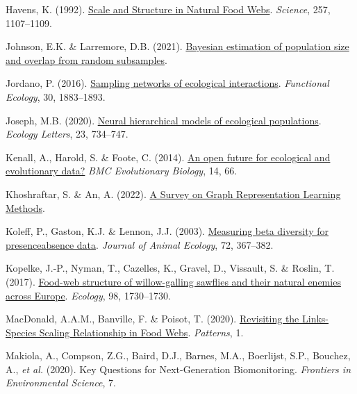 \documentclass[10pt,oneside]{article}
\newlength{\cslhangindent}
\newenvironment{CSLReferences}[3] %
 {%
  \setlength{\parindent}{0pt}
  \ifodd #1 \everypar{\setlength{\hangindent}{\cslhangindent}}\ignorespaces\fi
  \ifnum #2 > 0
  \setlength{\parskip}{#2\baselineskip}
  \fi
 }%
 {}
\begin{document}
\begin{CSLReferences}{1}{0}
\leavevmode{}%
Havens, K. (1992).
\href{https://doi.org/10.1126/science.257.5073.1107}{Scale and Structure
in Natural Food Webs}. \emph{Science}, 257, 1107--1109.

\leavevmode{}%
Johnson, E.K. \& Larremore, D.B. (2021).
\href{https://doi.org/10.1101/2021.07.06.451319}{Bayesian estimation of
population size and overlap from random subsamples}.

\leavevmode{}%
Jordano, P. (2016).
\href{https://doi.org/10.1111/1365-2435.12763}{Sampling networks of
ecological interactions}. \emph{Functional Ecology}, 30, 1883--1893.

\leavevmode{}%
Joseph, M.B. (2020). \href{https://doi.org/10.1111/ele.13462}{Neural
hierarchical models of ecological populations}. \emph{Ecology Letters},
23, 734--747.

\leavevmode{}%
Kenall, A., Harold, S. \& Foote, C. (2014).
\href{https://doi.org/10.1186/1471-2148-14-66}{An open future for
ecological and evolutionary data?} \emph{BMC Evolutionary Biology}, 14,
66.

\leavevmode{}%
Khoshraftar, S. \& An, A. (2022).
\href{https://doi.org/10.48550/arXiv.2204.01855}{A Survey on Graph
Representation Learning Methods}.

\leavevmode{}%
Koleff, P., Gaston, K.J. \& Lennon, J.J. (2003).
\href{https://doi.org/10.1046/j.1365-2656.2003.00710.x}{Measuring beta
diversity for presenceabsence data}. \emph{Journal of Animal Ecology},
72, 367--382.

\leavevmode{}%
Kopelke, J.-P., Nyman, T., Cazelles, K., Gravel, D., Vissault, S. \&
Roslin, T. (2017). \href{https://doi.org/10.1002/ecy.1832}{Food-web
structure of willow-galling sawflies and their natural enemies across
Europe}. \emph{Ecology}, 98, 1730--1730.

\leavevmode{}%
MacDonald, A.A.M., Banville, F. \& Poisot, T. (2020).
\href{https://doi.org/10.1016/j.patter.2020.100079}{Revisiting the
Links-Species Scaling Relationship in Food Webs}. \emph{Patterns}, 1.

\leavevmode{}%
Makiola, A., Compson, Z.G., Baird, D.J., Barnes, M.A., Boerlijst, S.P.,
Bouchez, A., \emph{et al.} (2020). Key Questions for Next-Generation
Biomonitoring. \emph{Frontiers in Environmental Science}, 7.


\end{CSLReferences}
\end{document}
